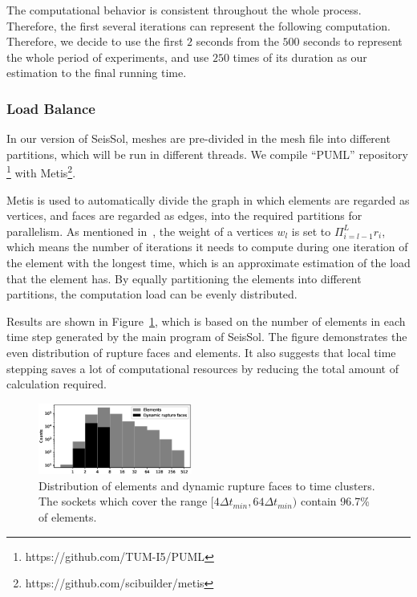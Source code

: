 \documentclass[5p,times]{sig-alternate-05-2015}
\begin{document}
The computational behavior is consistent throughout the whole process. Therefore, the first several iterations can represent the following computation. Therefore, we decide to use the first $2$ seconds from the $500$ seconds to represent the whole period of experiments, and use $250$ times of its duration as our estimation to the final running time.


\subsubsection{Load Balance}
In our version of SeisSol, meshes are pre-divided in the mesh file into different partitions, which will be run in different threads. We compile ``PUML'' repository \footnote{https://github.com/TUM-I5/PUML} with Metis\footnote{https://github.com/scibuilder/metis}. 

Metis is used to automatically divide the graph in which elements are regarded as vertices, and faces are regarded as edges, into the required partitions for parallelism. As mentioned in~\cite{LTS:7516082}, the weight of a vertices $w_l$ is set to $\Pi_{i=l-1}^L r_i$, which means the number of iterations it needs to compute during one iteration of the element with the longest time, which is an approximate estimation of the load that the element has. By equally partitioning the elements into different partitions, the computation load can be evenly distributed.

Results are shown in Figure~\ref{fig:lb}, which is based on the number of elements in each time step generated by the main program of SeisSol. The figure demonstrates the even distribution of rupture faces and elements. It also suggests that local time stepping saves a lot of computational resources by reducing the total amount of calculation required.

\begin{figure}[!ht]
	\centering
	\includegraphics[width=0.45\textwidth]{load.eps}
	\caption{Distribution of elements and dynamic rupture faces to time clusters. The sockets which cover the range $[4\Delta t_{min}, 64\Delta t_{min})$ contain 96.7\% of elements.}
	\label{fig:lb}
\end{figure}
\end{document}
